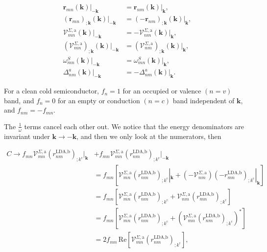 \begin{align}\label{time_reversal}
\mathbf{r}_{mn}(\mathbf{k})|_{-\mathbf{k}}                                          &=  \mathbf{r}_{nm}(\mathbf{k})|_{\mathbf{k}},                                      \nonumber\\
(\mathbf{r}_{mn})_{;\mathbf{k}}(\mathbf{k})|_{-\mathbf{k}}                          &=  (-\mathbf{r}_{nm})_{;\mathbf{k}}(\mathbf{k})|_{\mathbf{k}},                     \nonumber\\
\mathcal{V}^{\Sigma,\text{a}}_{mn}(\mathbf{k})|_{-\mathbf{k}}                       &=  -\mathbf{\mathcal{V}}_{nm}^{\Sigma,\text{a}}(\mathbf{k})|_{\mathbf{k}},         \nonumber\\
(\mathcal{V}^{\Sigma,\text{a}}_{mn})_{;\mathbf{k}}(\mathbf{k})|_{-\mathbf{k}}       &=  (\mathbf{\mathcal{V}}_{nm}^{\Sigma,\text{a}})_{;\mathbf{k}}(\mathbf{k})|_{\mathbf{k}},   \\
\omega_{mn}^{S}(\mathbf{k})|_{-\mathbf{k}}                                          &=  \omega_{mn}^{S}(\mathbf{k})|_{\mathbf{k}},                                      \nonumber\\
\Delta^a_{nm}(\mathbf{k})|_{-\mathbf{k}}                                            &=  -\Delta^a_{nm}(\mathbf{k})|_{\mathbf{k}}.                                       \nonumber
\end{align}

For a clean cold semiconductor, $f_{n} = 1$ for an occupied or valence $(n = v)$ band, and $f_{n} = 0$ for an empty or conduction $(n = c)$ band independent of $\mathbf{k}$, and $f_{nm}=-f_{mn}$.

The $\frac{1}{\omega}$ terms cancel each other out. We notice that the energy denominators are invariant under $\mathbf{k} \rightarrow - \mathbf{k}$, and then we only look at the numerators, then

\begin{align}\label{ct}
C \rightarrow f_{mn}\mathcal{V}^{\Sigma,\text{a}}_{mn}\left(r^{\text{LDA,b}}_{nm}\right)_{;k^{\text{c}}}|_{\mathbf{k}}
&+ f_{mn}\mathcal{V}^{\Sigma,\text{a}}_{mn}\left(r^{\text{LDA,b}}_{nm}\right)_{;k^{\text{c}}}|_{-\mathbf{k}}\nonumber\\
&= f_{mn}\left[\mathcal{V}^{\Sigma,\text{a}}_{mn}\left(r^{\text{LDA,b}}_{nm}\right)_{;k^{\text{c}}}|_{\mathbf{k}} + \left(-\mathcal{V}^{\Sigma,\text{a}}_{nm}\right)\left(-r^{\text{LDA,b}}_{mn}\right)_{;k^{\text{c}}}|_{\mathbf{k}}\right]\nonumber\\
&= f_{mn}\left[\mathcal{V}^{\Sigma,\text{a}}_{mn}\left(r^{\text{LDA,b}}_{nm}\right)_{;k^{\text{c}}} + \mathcal{V}^{\Sigma,\text{a}}_{nm}\left(r^{\text{LDA,b}}_{mn}\right)_{;k^{\text{c}}}\right]\nonumber\\
&= f_{mn}\left[\mathcal{V}^{\Sigma,\text{a}}_{mn}\left(r^{\text{LDA,b}}_{nm}\right)_{;k^{\text{c}}} + \left(\mathcal{V}^{\Sigma,\text{a}}_{mn}\left(r^{\text{LDA,b}}_{nm}\right)_{;k^{\text{c}}}\right)^*\right]\nonumber\\
&= 2f_{mn}\,\mathrm{Re}\left[\mathcal{V}^{\Sigma,\text{a}}_{mn}\left(r^{\text{LDA,b}}_{nm}\right)_{;k^{\text{c}}}\right],
\end{align}

